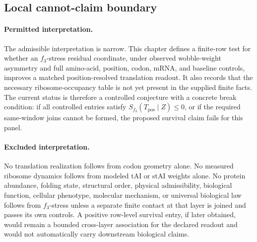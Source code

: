 \subsection{Local cannot-claim boundary}\label{sec:q6-f3-stress-position-resolved-translation-survival-boundary}

\paragraph{Permitted interpretation.} The admissible interpretation is narrow.  This chapter defines a finite-row test for whether an $f_3$-stress residual coordinate, under observed wobble-weight asymmetry and full amino-acid, position, codon, mRNA, and baseline controls, improves a matched position-resolved translation readout.  It also records that the necessary ribosome-occupancy table is not yet present in the supplied finite facts.  The current status is therefore a controlled conjecture with a concrete break condition: if all controlled entries satisfy $S_{f_3}(T_{\mathrm{pos}}\mid Z)\leq 0$, or if the required same-window joins cannot be formed, the proposed survival claim fails for this panel.

\paragraph{Excluded interpretation.} No translation realization follows from codon geometry alone.  No measured ribosome dynamics follows from modeled tAI or stAI weights alone.  No protein abundance, folding state, structural order, physical admissibility, biological function, cellular phenotype, molecular mechanism, or universal biological law follows from $f_3$-stress unless a separate finite contact at that layer is joined and passes its own controls.  A positive row-level survival entry, if later obtained, would remain a bounded cross-layer association for the declared readout and would not automatically carry downstream biological claims.
